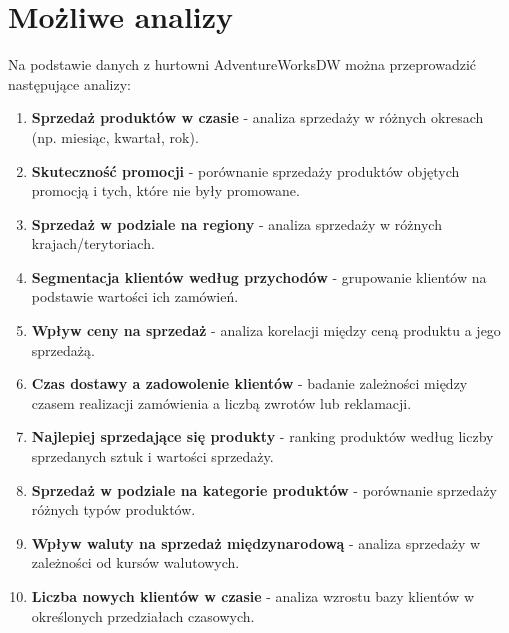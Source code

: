 \documentclass[a4paper,12pt]{article}
\begin{document}
\section{Możliwe analizy}

Na podstawie danych z hurtowni AdventureWorksDW można przeprowadzić następujące analizy:

\begin{enumerate}
    \item \textbf{Sprzedaż produktów w czasie} - analiza sprzedaży w różnych okresach (np. miesiąc, kwartał, rok).
    \item \textbf{Skuteczność promocji} - porównanie sprzedaży produktów objętych promocją i tych, które nie były promowane.
    \item \textbf{Sprzedaż w podziale na regiony} - analiza sprzedaży w różnych krajach/terytoriach.
    \item \textbf{Segmentacja klientów według przychodów} - grupowanie klientów na podstawie wartości ich zamówień.
    \item \textbf{Wpływ ceny na sprzedaż} - analiza korelacji między ceną produktu a jego sprzedażą.
    \item \textbf{Czas dostawy a zadowolenie klientów} - badanie zależności między czasem realizacji zamówienia a liczbą zwrotów lub reklamacji.
    \item \textbf{Najlepiej sprzedające się produkty} - ranking produktów według liczby sprzedanych sztuk i wartości sprzedaży.
    \item \textbf{Sprzedaż w podziale na kategorie produktów} - porównanie sprzedaży różnych typów produktów.
    \item \textbf{Wpływ waluty na sprzedaż międzynarodową} - analiza sprzedaży w zależności od kursów walutowych.
    \item \textbf{Liczba nowych klientów w czasie} - analiza wzrostu bazy klientów w określonych przedziałach czasowych.
\end{enumerate}
\end{document}
